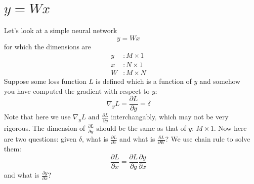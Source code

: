 \documentclass{article}
\begin{document}
\section{$y = Wx$}
Let's look at a simple neural network
\begin{equation}
    y = Wx
\end{equation}
for which the dimensions are
\begin{align}
    y &: M \times 1 \\
    x &: N \times 1 \\
    W &: M \times N
\end{align}
Suppose some loss function $L$ is defined which is a function of $y$ and somehow you have computed the gradient with respect to $y$:
\begin{equation}
    \nabla_yL = \frac{\partial L}{\partial y} = \delta
\end{equation}
Note that here we use $\nabla_yL$ and $\frac{\partial L}{\partial y}$ interchangably, which may not be very rigorous. The dimension of $\frac{\partial L}{\partial y}$ should be the same as that of $y$: $M \times 1$. Now here are two questions: given $\delta$, what is $\frac{\partial L}{\partial x}$ and what is $\frac{\partial L}{\partial W}$? We use chain rule to solve them:
\begin{equation}
    \frac{\partial L}{\partial x} = \frac{\partial L}{\partial y}\frac{\partial y}{\partial x}
\end{equation}
and what is $\frac{\partial y}{\partial x}$? 
\end{document}
